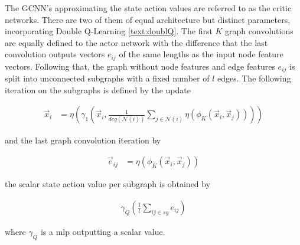 The GCNN's approximating the state action values are referred to as the critic networks. There are two of them of equal architecture but distinct parameters, incorporating Double Q-Learning \ref{text:doublQ}. The first $K$ graph convolutions are equally defined to the actor network with the difference that the last convolution outputs vectors $e_{ij}$ of the same lengths as the input node feature vectors.
Following that, the graph without node features and edge features $e_{ij}$ is split into unconnected subgraphs with a fixed number of $l$ edges. The following iteration on the subgraphs is defined by the update

\begin{align}
\vec{x}_i &= \eta \left( \gamma_1 \left(\vec{x}_i, \frac{1}{deg(\mathcal{N}(i))} \sum_{j \in \mathcal{N}(i)}  \eta \left( \phi_K \left(\vec{x}_i, \vec{x}_j\right)\right) \right)\right)
\end{align}

and the last graph convolution iteration by

\begin{align}
\vec{e}_{ij} &= \eta \left( \phi_K \left(\vec{x}_i, \vec{x}_j \right)\right)
\end{align}

the scalar state action value per subgraph is obtained by

\begin{align}
	\gamma_{Q}\left( \frac{1}{l} \sum_{ij\in sg} e_{ij} \right)
\end{align}

where $\gamma_{Q}$ is a mlp outputting a scalar value.